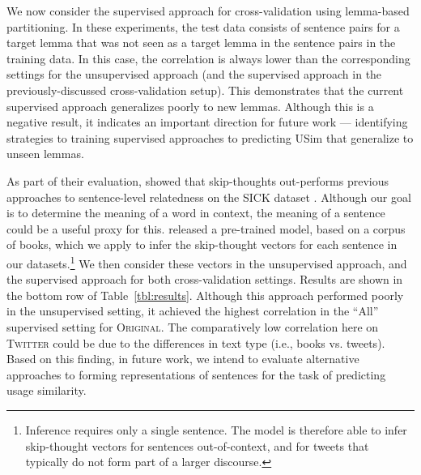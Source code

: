 \documentclass[11pt]{article}
\newcommand\original{\textsc{Original}\xspace}
\newcommand\twitter{\textsc{Twitter}\xspace}
\newcommand{\tabref}[1]{Table~\ref{#1}}
\begin{document}
We now consider the supervised approach for cross-validation using
lemma-based partitioning. In these experiments, the test data consists
of sentence pairs for a target lemma that was not seen as a target
lemma in the sentence pairs in the training data. In this case, the
correlation is always lower than the corresponding settings for the
unsupervised approach (and the supervised approach in the
previously-discussed cross-validation setup). This demonstrates that
the current supervised approach generalizes poorly to new
lemmas. Although this is a negative result, it indicates an important
direction for future work --- identifying strategies to training
supervised approaches to predicting USim that generalize to unseen
lemmas.

 As part of their evaluation,
\citeauthor{Kiros+:2015} showed that skip-thoughts out-performs
previous approaches to sentence-level relatedness on the SICK dataset
\citep{Marelli+:2014}. Although our goal is to determine the meaning
of a word in context, the meaning of a sentence could be a useful
proxy for this. \citeauthor{Kiros+:2015} released a pre-trained model,
based on a corpus of books, which we apply to infer the skip-thought
vectors for each sentence in our datasets.\footnote{Inference requires
  only a single sentence. The model is therefore able to infer
  skip-thought vectors for sentences out-of-context, and for tweets
  that typically do not form part of a larger discourse.} We then
consider these vectors in the unsupervised approach, and the
supervised approach for both cross-validation settings. Results are
shown in the bottom row of \tabref{tbl:results}.  Although this
approach performed poorly in the unsupervised setting, it achieved the
highest correlation in the ``All'' supervised setting for
\original. The comparatively low correlation here on \twitter could be
due to the differences in text type (i.e., books vs. tweets).  Based
on this finding, in future work, we intend to evaluate alternative
approaches to forming representations of sentences
\citep[e.g.,][]{Le:Mikolov:2014} for the task of predicting usage
similarity.



\end{document}
